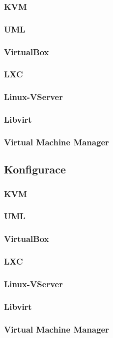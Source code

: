 \subsubsection{KVM}

\subsubsection{UML}
\subsubsection{VirtualBox}
\subsubsection{LXC}
\subsubsection{Linux-VServer}
\subsubsection{Libvirt}
\subsubsection{Virtual Machine Manager}

\subsection{Konfigurace}
\subsubsection{\xen}
\subsubsection{KVM}
\subsubsection{UML}
\subsubsection{VirtualBox}
\subsubsection{LXC}
\subsubsection{Linux-VServer}
\subsubsection{Libvirt}
\subsubsection{Virtual Machine Manager}
